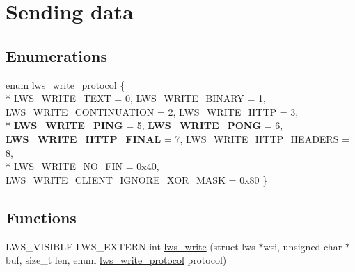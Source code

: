 \hypertarget{group__sending-data}{}\section{Sending data}
\label{group__sending-data}
\subsection*{Enumerations}
\begin{DoxyCompactItemize}
\item 
enum \hyperlink{group__sending-data_ga98b099cf8c1c7e38ad78501f270e193d}{lws\+\_\+write\+\_\+protocol} \{ \\*
\hyperlink{group__sending-data_gga98b099cf8c1c7e38ad78501f270e193da80e8f169fda236c56bfb795ed62903db}{L\+W\+S\+\_\+\+W\+R\+I\+T\+E\+\_\+\+T\+E\+XT} = 0, 
\hyperlink{group__sending-data_gga98b099cf8c1c7e38ad78501f270e193daf6486c0dba50c44198100717721d9ab2}{L\+W\+S\+\_\+\+W\+R\+I\+T\+E\+\_\+\+B\+I\+N\+A\+RY} = 1, 
\hyperlink{group__sending-data_gga98b099cf8c1c7e38ad78501f270e193da10047eb05b5e1c298151dc47a5b44826}{L\+W\+S\+\_\+\+W\+R\+I\+T\+E\+\_\+\+C\+O\+N\+T\+I\+N\+U\+A\+T\+I\+ON} = 2, 
\hyperlink{group__sending-data_gga98b099cf8c1c7e38ad78501f270e193dabb6705e1d1327cdda5025be28f07712e}{L\+W\+S\+\_\+\+W\+R\+I\+T\+E\+\_\+\+H\+T\+TP} = 3, 
\\*
{\bfseries L\+W\+S\+\_\+\+W\+R\+I\+T\+E\+\_\+\+P\+I\+NG} = 5, 
{\bfseries L\+W\+S\+\_\+\+W\+R\+I\+T\+E\+\_\+\+P\+O\+NG} = 6, 
{\bfseries L\+W\+S\+\_\+\+W\+R\+I\+T\+E\+\_\+\+H\+T\+T\+P\+\_\+\+F\+I\+N\+AL} = 7, 
\hyperlink{group__sending-data_gga98b099cf8c1c7e38ad78501f270e193dafe5a38e940ce56708ac814627e9c0917}{L\+W\+S\+\_\+\+W\+R\+I\+T\+E\+\_\+\+H\+T\+T\+P\+\_\+\+H\+E\+A\+D\+E\+RS} = 8, 
\\*
\hyperlink{group__sending-data_gga98b099cf8c1c7e38ad78501f270e193da115440f272a5d55518adfc8099acfee3}{L\+W\+S\+\_\+\+W\+R\+I\+T\+E\+\_\+\+N\+O\+\_\+\+F\+IN} = 0x40, 
\hyperlink{group__sending-data_gga98b099cf8c1c7e38ad78501f270e193da220d8e8652d9b97fb66e476e2a60ffce}{L\+W\+S\+\_\+\+W\+R\+I\+T\+E\+\_\+\+C\+L\+I\+E\+N\+T\+\_\+\+I\+G\+N\+O\+R\+E\+\_\+\+X\+O\+R\+\_\+\+M\+A\+SK} = 0x80
 \}
\end{DoxyCompactItemize}
\subsection*{Functions}
\begin{DoxyCompactItemize}
\item 
L\+W\+S\+\_\+\+V\+I\+S\+I\+B\+LE L\+W\+S\+\_\+\+E\+X\+T\+E\+RN int \hyperlink{group__sending-data_gafd5fdd285a0e25ba7e3e1051deec1001}{lws\+\_\+write} (struct lws $\ast$wsi, unsigned char $\ast$buf, size\+\_\+t len, enum \hyperlink{group__sending-data_ga98b099cf8c1c7e38ad78501f270e193d}{lws\+\_\+write\+\_\+protocol} protocol)
\end{DoxyCompactItemize}


